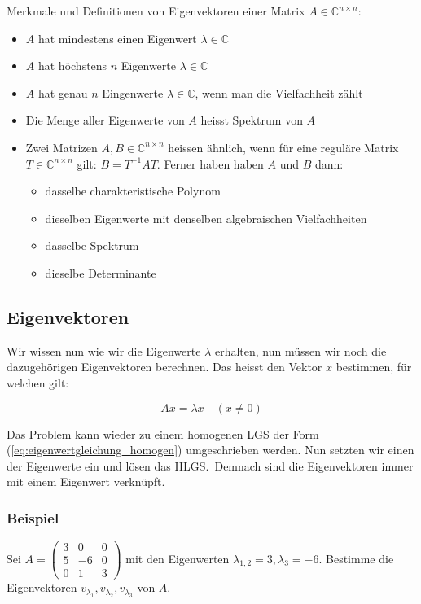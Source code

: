 \vspace{1\baselineskip}

Merkmale und Definitionen von Eigenvektoren einer Matrix \( A \in \mathbb{C}^{n \times n} \):

\begin{itemize}
    \item \( A \) hat mindestens einen Eigenwert \( \lambda \in \mathbb{C} \)
    \item \( A \) hat höchstens \( n \) Eigenwerte \( \lambda \in \mathbb{C} \)
    \item \( A \) hat genau \( n \) Eingenwerte \( \lambda \in \mathbb{C} \), wenn man die Vielfachheit zählt
    \item Die Menge aller Eigenwerte von \( A \) heisst Spektrum von \( A \) 
    \item Zwei Matrizen \( A, B \in \mathbb{C}^{n \times n} \) heissen ähnlich, wenn für eine reguläre Matrix \( T \in \mathbb{C}^{n \times n} \) gilt: \( B = T^{-1} A T \). Ferner haben haben \( A \) und \( B \) dann:
    \begin{itemize}
        \item dasselbe charakteristische Polynom
        \item dieselben Eigenwerte mit denselben algebraischen Vielfachheiten
        \item dasselbe Spektrum
        \item dieselbe Determinante
    \end{itemize}
\end{itemize}

\subsection{Eigenvektoren}

Wir wissen nun wie wir die Eigenwerte \( \lambda \) erhalten, nun müssen wir noch die dazugehörigen Eigenvektoren berechnen. Das heisst den Vektor \( x \) bestimmen, für welchen gilt:

\begin{equation*}
    Ax = \lambda x \quad (x \neq 0)
\end{equation*}

Das Problem kann wieder zu einem homogenen LGS der Form (\ref{eq:eigenwertgleichung_homogen}) umgeschrieben werden. Nun setzten wir einen der Eigenwerte ein und lösen das HLGS.\ Demnach sind die Eigenvektoren immer mit einem Eigenwert verknüpft.

\subsubsection*{Beispiel}
Sei \( A = \begin{pmatrix} 3 & 0 & 0 \\ 5 & -6 & 0 \\ 0 & 1 & 3 \end{pmatrix} \) mit den Eigenwerten \( \lambda_{1,2} = 3, \lambda_3 = -6 \). Bestimme die Eigenvektoren \( v_{\lambda_1}, v_{\lambda_2}, v_{\lambda_3} \) von \( A \).

